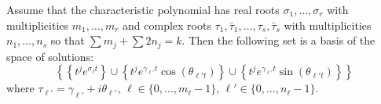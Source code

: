 \documentclass[12pt]{extarticle}
\begin{document}
\begin{theorem}{}{}
    Assume that the characteristic polynomial has real roots $\sigma_1, \dots, \sigma_r$ with multiplicities \newline $m_1,\dots,m_r$ and complex roots $\tau_1, \bar \tau_1, \dots, \tau_s, \bar \tau_s$ with multiplicities $n_1, \dots, n_s$ so that
    $\sum m_j + \sum 2n_j = k$.
    Then the following set is a basis of the space of solutions:
    \begin{equation}
        \left\{ \left\{ t^je^{\sigma_\ell t} \right\} \cup \left\{ t^je^{\gamma_{\ell'} t} \cos(\theta_{\ell' t}) \right\} \cup \left\{ t^je^{\gamma_{\ell'} t} \sin(\theta_{\ell' t}) \right\} \right\}
    \end{equation}
    where $\tau_{\ell'} =\gamma_{\ell'} + i \theta _{\ell'}$, $\ell \in \{0, \dots, m_\ell-1\}$, $\ell' \in \{ 0,\dots, n_\ell -1 \}$.
\end{theorem}
\end{document}

